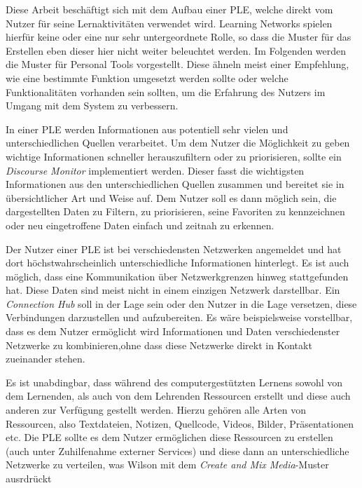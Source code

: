 Diese Arbeit beschäftigt sich mit dem Aufbau einer \ac{PLE}, welche direkt vom Nutzer für seine Lernaktivitäten verwendet wird. Learning Networks spielen hierfür keine oder eine nur sehr untergeordnete Rolle, so dass die Muster für das Erstellen eben dieser hier nicht weiter beleuchtet werden. Im Folgenden werden die Muster für Personal Tools vorgestellt. Diese ähneln meist einer Empfehlung, wie eine bestimmte Funktion umgesetzt werden sollte oder welche Funktionalitäten vorhanden sein sollten, um die Erfahrung des Nutzers im Umgang mit dem System zu verbessern.

In einer PLE werden Informationen aus potentiell sehr vielen und unterschiedlichen Quellen verarbeitet. Um dem Nutzer die Möglichkeit zu geben wichtige Informationen schneller herauszufiltern oder zu priorisieren, sollte ein \emph{Discourse Monitor} implementiert werden. Dieser fasst die wichtigsten Informationen aus den unterschiedlichen Quellen zusammen und bereitet sie in übersichtlicher Art und Weise auf. Dem Nutzer soll es dann möglich sein, die dargestellten Daten zu Filtern, zu priorisieren, seine Favoriten zu kennzeichnen oder neu eingetroffene Daten einfach und zeitnah zu erkennen. 

Der Nutzer einer PLE ist bei verschiedensten Netzwerken angemeldet und hat dort höchstwahrscheinlich unterschiedliche Informationen hinterlegt. Es ist auch möglich, dass eine Kommunikation über Netzwerkgrenzen hinweg stattgefunden hat. Diese Daten sind meist nicht in einem einzigen Netzwerk darstellbar. Ein \emph{Connection Hub} soll in der Lage sein oder den Nutzer in die Lage versetzen, diese Verbindungen darzustellen und aufzubereiten. Es wäre beispielsweise vorstellbar, dass es dem Nutzer ermöglicht wird Informationen und Daten verschiedenster Netzwerke zu kombinieren,ohne dass diese Netzwerke direkt in Kontakt zueinander stehen.

Es ist unabdingbar, dass während des computergestützten Lernens sowohl von dem Lernenden, als auch von dem Lehrenden Ressourcen erstellt und diese auch anderen zur Verfügung gestellt werden. Hierzu gehören alle Arten von Ressourcen, also Textdateien, Notizen, Quellcode, Videos, Bilder, Präsentationen etc. Die \ac{PLE} sollte es dem Nutzer ermöglichen diese Ressourcen zu erstellen (auch unter Zuhilfenahme externer Services) und diese dann an unterschiedliche Netzwerke zu verteilen, was Wilson mit dem \emph{Create and Mix Media}-Muster ausrdrückt

